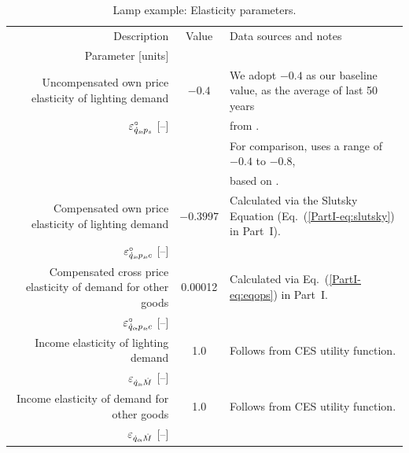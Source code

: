 \documentclass[12pt]{article}\usepackage[]{graphicx}\usepackage[]{xcolor}
\begin{document}
\begin{landscape}
\begin{table}
\footnotesize
\begin{center}
\caption{Lamp example: Elasticity parameters.}
\label{tab:lamp_elasticity_parameters}
\begin{tabular}{ r c l }
  \toprule
  Description & Value & Data sources and notes \\
  Parameter [units] & & \\
  \midrule
  Uncompensated own price elasticity of lighting demand  &   $-0.4$  & We adopt $-0.4$ as our baseline value, as the average of last 50 years \\
  $\varepsilon^\circ_{\dot{q}_s\!,p_s}$ [--]                                                             &           &   from \citet[Fig.~4]{Fouquet2014}. \\  
                                                            &           &  For comparison, \citet{Borenstein:2015aa} uses a range of $-0.4$ to $-0.8$, \\   
                                                            &            &     based on \citet{Fouquet2011}. \\
  \midrule
  Compensated own price elasticity of lighting demand                 &  $-0.3997$      & Calculated via the Slutsky Equation (Eq.~(\ref{PartI-eq:slutsky}) in Part~I).  \\
  $\varepsilon^\circ_{\dot{q}_s\!,p_s\!,c}$ [--]                                           &           &   \\    
  \midrule   
  Compensated cross price elasticity of demand for other goods        &   0.00012     & Calculated via Eq.~(\ref{PartI-eq:eqops}) in Part~I.  \\
  $\varepsilon^\circ_{\dot{q}_o\!,p_s\!,c}$ [--]                                           &           &   \\ 
  \midrule   
  Income elasticity of lighting demand                    &   1.0     & Follows from CES utility function. \\
  $\varepsilon_{\dot{q}_s\!,\dot{M}}$ [--]                                            &           &   \\ 
  \midrule   
  Income elasticity of demand for other goods             &   1.0     & Follows from CES utility function. \\
  $\varepsilon_{\dot{q}_o\!,\dot{M}}$ [--]                                            &           &   \\
  \bottomrule
\end{tabular}
\end{center}
\end{table}
\end{landscape}
\end{document}
